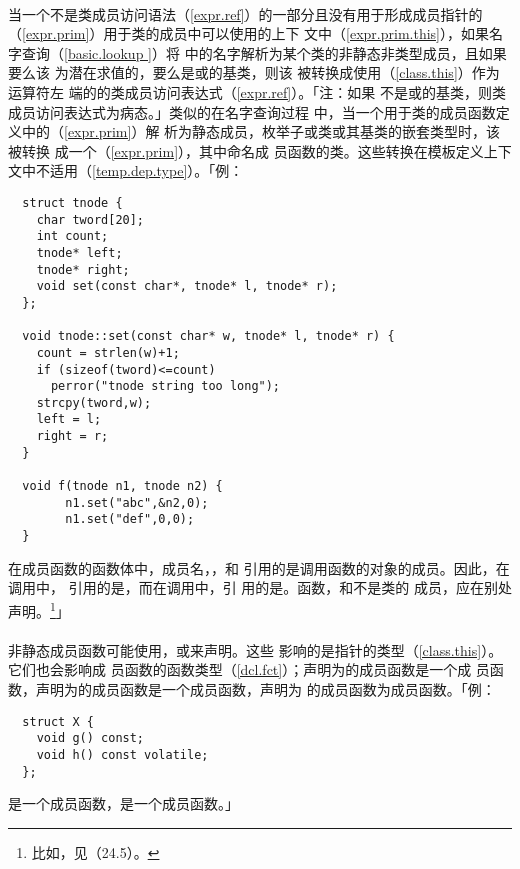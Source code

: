 \paragraph{}
当一个不是类成员访问语法（\ref{expr.ref}）的一部分且没有用于形成成员指针的
（\ref{expr.prim}）用于类的成员中可以使用的上下
文中（\ref{expr.prim.this}），如果名字查询（\ref{basic.lookup }）将
中的名字解析为某个类的非静态非类型成员，且如果要么该
为潜在求值的，要么是或的基类，则该
被转换成使用（\ref{class.this}）作为运算符左
端的的类成员访问表达式（\ref{expr.ref}）。「注：如果
不是或的基类，则类成员访问表达式为病态。」类似的在名字查询过程
中，当一个用于类的成员函数定义中的（\ref{expr.prim}）解
析为静态成员，枚举子或类或其基类的嵌套类型时，该被转换
成一个（\ref{expr.prim}），其中命名成
员函数的类。这些转换在模板定义上下文中不适用（\ref{temp.dep.type}）。「例：
\begin{lstlisting}
  struct tnode {
    char tword[20];
    int count;
    tnode* left;
    tnode* right;
    void set(const char*, tnode* l, tnode* r);
  };

  void tnode::set(const char* w, tnode* l, tnode* r) {
    count = strlen(w)+1;
    if (sizeof(tword)<=count)
      perror("tnode string too long");
    strcpy(tword,w);
    left = l;
    right = r;
  }

  void f(tnode n1, tnode n2) {
		n1.set("abc",&n2,0);
		n1.set("def",0,0);
  }
\end{lstlisting}
在成员函数的函数体中，成员名，，和
引用的是调用函数的对象的成员。因此，在调用中，
引用的是，而在调用中，引
用的是。函数，和不是类的
成员，应在别处声明。\footnote{比如，见（24.5）。}」

\paragraph{}
非静态成员函数可能使用，或来声明。这些
影响的是指针的类型（\ref{class.this}）。它们也会影响成
员函数的函数类型（\ref{dcl.fct}）；声明为的成员函数是一个成
员函数，声明为的成员函数是一个成员函数，声明为
的成员函数为成员函数。「例：
\begin{lstlisting}
  struct X {
    void g() const;
    void h() const volatile;
  };
\end{lstlisting}
是一个成员函数，是一个成员函数。」

